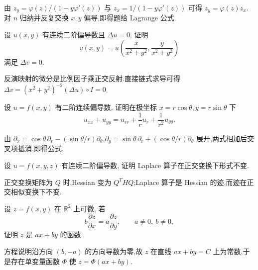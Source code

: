 \begin{solution}
    由 $z_y=\varphi(z)/(1-y\varphi'(z))$ 与 $z_x=1/(1-y\varphi'(z))$ 可得 $z_y=\varphi(z)z_x$.对 $n$ 归纳并反复交换 $x,y$ 偏导,即得题给 Lagrange 公式.
\end{solution}

\begin{example}
    设 $u(x,y)$ 有连续二阶偏导数且 $\Delta u=0$, 证明
    \[
        v(x,y)=u\left(\dfrac{x}{x^2+y^2},\dfrac{y}{x^2+y^2}\right)
    \]
    满足 $\Delta v=0$.
\end{example}
\exampleblank

\begin{solution}
    反演映射的微分是比例因子乘正交反射.直接链式求导可得
    $\Delta v=(x^2+y^2)^{-2}(\Delta u)\circ I=0$.
\end{solution}

\begin{example}
    设 $u=f(x,y)$ 有二阶连续偏导数, 证明在极坐标 $x=r\cos\theta,y=r\sin\theta$ 下
    \[
        u_{xx}+u_{yy}=u_{rr}+\dfrac{1}{r}u_r+\dfrac{1}{r^2}u_{\theta\theta}.
    \]
\end{example}
\exampleblank

\begin{solution}
    由 $\partial_x=\cos\theta\,\partial_r-(\sin\theta/r)\partial_\theta$,$\partial_y=\sin\theta\,\partial_r+(\cos\theta/r)\partial_\theta$ 展开,两式相加后交叉项抵消,即得公式.
\end{solution}

\begin{example}
    设 $u=f(x,y,z)$ 有连续二阶偏导数, 证明 Laplace 算子在正交变换下形式不变.
\end{example}
\exampleblank

\begin{solution}
    正交变换矩阵为 $Q$ 时,Hessian 变为 $Q^THQ$;Laplace 算子是 Hessian 的迹,而迹在正交相似变换下不变.
\end{solution}

\begin{example}
    设 $z=f(x,y)$ 在 $\mathbb{R}^2$ 上可微, 若
    \[
        b\dfrac{\partial z}{\partial x}=a\dfrac{\partial z}{\partial y},
        \qquad a\ne0,\ b\ne0,
    \]
    证明 $z$ 是 $ax+by$ 的函数.
\end{example}
\exampleblank

\begin{solution}
    方程说明沿方向 $(b,-a)$ 的方向导数为零,故 $z$ 在直线 $ax+by=C$ 上为常数,于是存在单变量函数 $\Phi$ 使 $z=\Phi(ax+by)$.
\end{solution}

